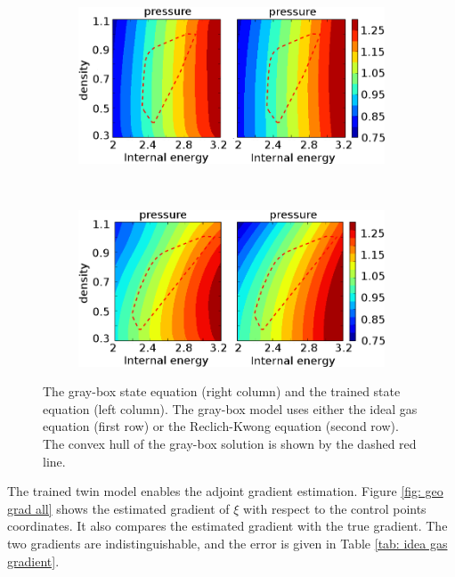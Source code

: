 \begin{figure}[htbp]\begin{center}
    \begin{subfigure}[t]{.99\textwidth}
        \centering
        \includegraphics[height=5.cm]{../state_eqn_vdw.png}
        \label{fig: graysol Ubend}
    \end{subfigure}\\
    \begin{subfigure}[t]{.99\textwidth}
        \centering
        \includegraphics[height=5.cm]{../state_eqn_rk.png}
        \label{fig: errsol Ubend}
    \end{subfigure}
    \caption{The gray-box state equation (right column) and the trained state equation 
             (left column). The gray-box model uses either the ideal gas equation
             (first row) or the Reclich-Kwong equation (second row). The convex hull 
             of the gray-box solution is shown by the dashed red line.}
    \label{fig: state err Ubend}
\end{center}\end{figure}

The trained twin model enables the adjoint gradient estimation.
Figure \ref{fig: geo grad all} shows the
estimated gradient of $\xi$ with respect to the control points coordinates. It also
compares the estimated gradient with the true gradient. The two gradients are indistinguishable,
and the error is given in Table \ref{tab: idea gas gradient}.

